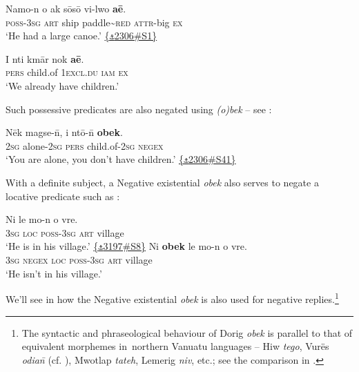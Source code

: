 \documentclass[output=paper,colorlinks,citecolor=brown,draft]{langscibook}
\begin{document}
\ea\label{ex:dor:canoe} 
    \gll  Namo-n o ak sōsō vi-lwo \textbf{aē}.\\ 
          \textsc{poss}-\textsc{3sg} \textsc{art} ship paddle{\textasciitilde}\textsc{red} \textsc{attr}-big \textsc{ex}\\
    \glt ‘He had a large canoe.’  \href{https://doi.org/10.24397/pangloss-0002306#S1}{\{\texttt{⚓}2306\#S1\}}
\z 


\ea\label{ex:dor:child} 
    \gll  I nti kmār nok \textbf{aē}.\\ 
          \textsc{pers} child.of \textsc{1excl.du} \textsc{iam} \textsc{ex}\\
    \glt ‘We already have children.’   
\z 

\noindent Such possessive predicates are also negated using \textit{(o)bek} – see :

\ea\label{ex:dor:nochild} 
    \gll  Nēk magse-\={n}, i ntō-\={n} \textbf{obek}.\\ 
          \textsc{2sg} alone-\textsc{2sg} \textsc{pers} child.of-\textsc{2sg} \textsc{negex}\\
    \glt  ‘You are alone, you don’t have children.’ \quad  \href{https://doi.org/10.24397/pangloss-0002306#S41}{\{\texttt{⚓}2306\#S41\}}
\z 

With a definite subject, a Negative existential \textit{obek} also serves to negate a locative predicate such as :

\ea\label{ex:dor:village}
    \ea\label{ex:dor:village1} 
        \gll  Ni le mo-n o vre. \\ 
             \textsc{3sg} \textsc{loc} \textsc{poss-}\textsc{3sg} \textsc{art} village \\
        \glt ‘He is in his village.’ \quad  \href{https://doi.org/10.24397/pangloss-0003197#S8}{\{\texttt{⚓}3197\#S8\}}
    \ex\label{ex:dor:village2}
        \gll  Ni \textbf{obek} le mo-n o vre.\\ 
             \textsc{3sg} \textsc{negex} \textsc{loc} \textsc{poss-}\textsc{3sg} \textsc{art} village\\
        \glt ‘He isn’t in his village.’ 
    \z 
\z 


\noindent We’ll see in  how the Negative existential \textit{obek} is also used for negative replies.\footnote{The syntactic and phraseological behaviour of Dorig \textit{obek} is parallel to that of equivalent morphemes in~northern Vanuatu languages – Hiw \textit{tego}, Vurës \textit{odia\={n}} (cf. \citealt[66]{Malau2016}), Mwotlap \textit{tateh}, Lemerig \textit{niv}, etc.; see the comparison in \citet[214, 219--221]{François2011}.}
\end{document}
